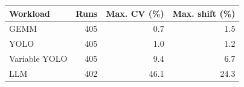 \begin{tabular}{@{}lrrr@{}}
\toprule
Workload & Runs & Max. CV (\%) & Max. shift (\%) \\
\midrule
GEMM & 405 & 0.7 & 1.5 \\
YOLO & 405 & 1.0 & 1.2 \\
Variable YOLO & 405 & 9.4 & 6.7 \\
LLM & 402 & 46.1 & 24.3 \\
\bottomrule
\end{tabular}
